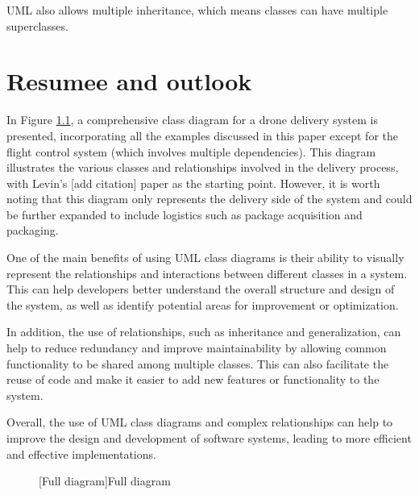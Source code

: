 \documentclass[
	12pt,
    a4paper,
    egregdoesnotlikesansseriftitles, %
    toc=chapterentrywithdots,
    oneside, openany,
    titlepage,
    parskip=half,
    headings=normal,  %
    listof=totoc,
    bibliography=totocnumbered,
    index=totoc,
    captions=tableheading,  %
    listof=flat,
    numbers=noenddot, %
    final]
    {scrbook}
\begin{document}
UML also allows multiple inheritance, which means classes can have multiple superclasses. \cite[p. 71] {seidl2015uml}

\chapter{Resumee and outlook}


In Figure \ref{fig:full}, a comprehensive class diagram for a drone delivery system is presented, incorporating all the examples discussed in this paper except for the flight control system (which involves multiple dependencies). 
This diagram illustrates the various classes and relationships involved in the delivery process, with Levin's [add citation] paper as the starting point. 
However, it is worth noting that this diagram only represents the delivery side of the system and could be further expanded to include logistics such as package acquisition and packaging.

One of the main benefits of using UML class diagrams is their ability to visually represent the relationships and interactions between different classes in a system. 
This can help developers better understand the overall structure and design of the system, as well as identify potential areas for improvement or optimization.

In addition, the use of relationships, such as inheritance and generalization, can help to reduce redundancy and improve maintainability by allowing common functionality to be shared among multiple classes. This can also facilitate the reuse of code and make it easier to add new features or functionality to the system.

Overall, the use of UML class diagrams and complex relationships can help to improve the design and development of software systems, leading to more efficient and effective implementations.


\begin{figure}[p]
	\centering
	[Full diagram]{Full diagram}
	\label{fig:full}
\end{figure}
\end{document}
